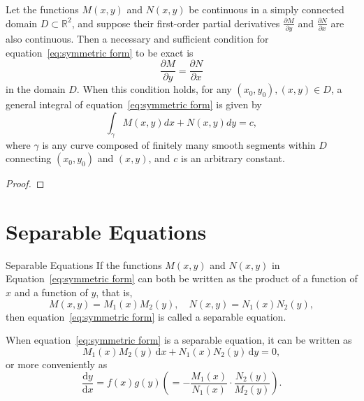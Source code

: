 \documentclass[11pt]{elegantbook}
\begin{document}
\begin{theorem}
    Let the functions \(M(x, y)\) and \(N(x, y)\) be continuous in a simply connected domain \(D \subset \mathbb{R}^2\), 
    and suppose their first-order partial derivatives \(\frac{\partial M}{\partial y}\) and \(\frac{\partial N}{\partial x}\) are also continuous. 
    Then a necessary and sufficient condition for equation~\eqref{eq:symmetric form} to be exact is
    \[
    \frac{\partial M}{\partial y} = \frac{\partial N}{\partial x}
    \]
    in the domain \(D\). 
    When this condition holds, for any \((x_0, y_0), (x, y) \in D\), a general integral of equation~\eqref{eq:symmetric form} is given by
    \[
    \int_{\gamma} M(x, y)dx + N(x, y)dy = c,
    \]
    where \(\gamma\) is any curve composed of finitely many smooth segments within \(D\) 
    connecting \((x_0, y_0)\) and \((x, y)\), and \(c\) is an arbitrary constant.
\end{theorem}
\begin{proof}
    
\end{proof}

\section{Separable Equations}
\begin{definition}{Separable Equations}
    If the functions \(M(x, y)\) and \(N(x, y)\) in Equation~\eqref{eq:symmetric form} can both be written as 
    the product of a function of \(x\) and a function of \(y\), that is,
    \[
    M(x, y) = M_1(x) M_2(y), \quad N(x, y) = N_1(x) N_2(y),
    \]
    then equation~\eqref{eq:symmetric form} is called a separable equation.

    When equation~\eqref{eq:symmetric form} is a separable equation, it can be written as
    \begin{equation}\label{eq:separable form}
        M_1(x) M_2(y) \, \mathrm{d}x + N_1(x) N_2(y) \, \mathrm{d}y = 0,
    \end{equation}
    or more conveniently as
    \begin{equation}\label{eq:separable form 2}
        \frac{\mathrm{d}y}{\mathrm{d}x} = f(x)g(y) \left(= -\frac{M_1(x)}{N_1(x)} \cdot \frac{N_2(y)}{M_2(y)}\right).
    \end{equation}

\end{definition}
\end{document}
